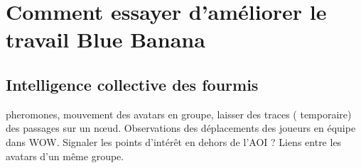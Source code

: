 \section{Comment essayer d'améliorer le travail Blue Banana}
	\subsection{Intelligence collective des fourmis}
		pheromones, mouvement des avatars en groupe, laisser des traces ( temporaire) des passages sur un nœud. Observations des déplacements des joueurs en équipe dans WOW.
		Signaler les points d'intérêt en dehors de l'AOI ? 
		Liens entre les avatars d'un même groupe.	
		

